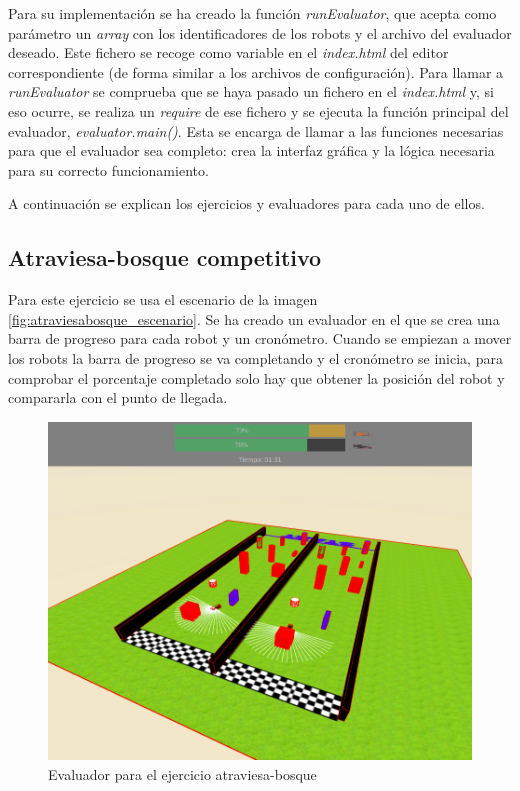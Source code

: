 Para su implementación se ha creado la función \textit{runEvaluator}, que acepta como parámetro un \textit{array} con los identificadores de los robots y el archivo del evaluador deseado. Este fichero se recoge como variable en el \textit{index.html} del editor correspondiente (de forma similar a los archivos de configuración). 
Para llamar a \textit{runEvaluator} se comprueba que se haya pasado un fichero en el \textit{index.html} y, si eso ocurre, se realiza un \textit{require} de ese fichero y se ejecuta la función principal del evaluador, \textit{evaluator.main()}. Esta se encarga de llamar a las funciones necesarias para que el evaluador sea completo: crea la interfaz gráfica y la lógica necesaria para su correcto funcionamiento.

A continuación se explican los ejercicios y evaluadores para cada uno de ellos. 

\subsection{Atraviesa-bosque competitivo}

Para este ejercicio se usa el escenario de la imagen \ref{fig:atraviesabosque_escenario}. Se ha creado un evaluador en el que se crea una barra de progreso para cada robot y un cronómetro. Cuando se empiezan a mover los robots la barra de progreso se va completando y el cronómetro se inicia, para comprobar el porcentaje completado solo hay que obtener la posición del robot y compararla con el punto de llegada.

\begin{figure}[H]
\centering           
\includegraphics[scale=0.3]{img/evaluador_forest.png}
\caption{Evaluador para el ejercicio atraviesa-bosque}
\label{fig:evaluador_bosque}
\end{figure}



